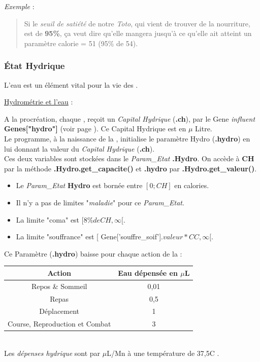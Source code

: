 \documentclass[french]{report}
\newlength{\du}\fi
\begin{document}
\textit{Exemple} :
\begin{quote}
	Si le \textit{seuil de satiété} de notre \CoCiX \emph{Toto}, qui vient de trouver de la nourriture, est de \textbf{95\%}, ça veut dire qu'elle mangera jusqu'à ce qu'elle ait atteint un paramètre calorie = 51 (95\% de 54).\\
\end{quote}

\subsubsection{État Hydrique}\label{hydro}
L'eau est un élément vital pour la vie des \CoCiX.

\begin{center}
	\underline{Hydrométrie et l'eau} :
\end{center}
A la procréation, chaque \CoCiX, reçoit un \textit{Capital Hydrique} (\textbf{.ch}), par le Gene \textit{influent} \textbf{Genes["hydro"]} (voir page \pageref{liste_gene}). Ce Capital Hydrique est en $\mu$ Litre.\\

Le programme, à la naissance de la \CoCiX, initialise le paramètre Hydro (\textbf{.hydro}) en lui donnant la valeur du \textit{Capital Hydrique} (\textbf{.ch}).\\

Ces deux variables sont stockées dans le\textit{ Param\_Etat} \textbf{.Hydro}. On accède à \textbf{CH} par la méthode \textbf{.Hydro.get\_capacite()} et \textbf{.hydro} par \textbf{.Hydro.get\_valeur()}.\\
\begin{itemize}
	\item Le \textit{Param\_Etat} \textbf{Hydro} est bornée entre $[0; CH]$ en calories.\\
	\item Il n'y a pas de limites "\textit{maladie}" pour ce \textit{Param\_Etat}.\\
	\item La limite "coma" est $[8\% de CH ,\infty [$.\\
	\item La limite "souffrance" est [ Gene['souffre\_soif'].$valeur * CC , \infty [$.\\
\end{itemize}

Ce Paramètre (\textbf{.hydro}) baisse pour chaque action de la \CoCiX  :\\
\begin{center}
	\begin{tabular}{|c|c|}\hline
		\rowcolor{yellow}\textbf{Action} & \textbf{Eau dépensée en $\mu$L}\\ \hline
		Repos \& Sommeil  & 0,01 \\ \hline
		Repas & 0,5 \\ \hline
		Déplacement & 1 \\ \hline
		Course, Reproduction et Combat & 3\\ \hline
	\end{tabular}\\
	Les \textit{dépenses hydrique} sont par $\mu$L/Mn à une température de 37,5\degres C .
\end{center}
\end{document}
